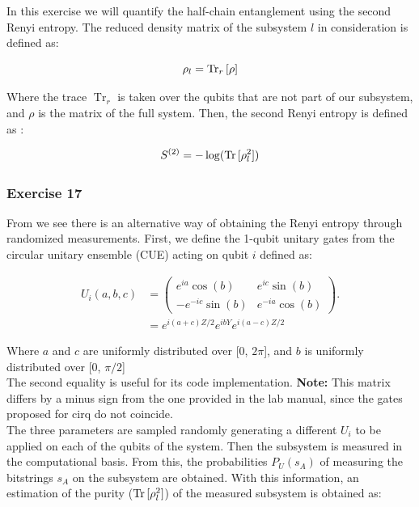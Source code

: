 In this exercise we will quantify the half-chain entanglement using the second Renyi entropy. The reduced density matrix of the subsystem $l$ in consideration is defined as:

\begin{equation}
    \rho_l = \operatorname{Tr}_r{[\rho]}
    \label{eq:reduced_matrix}
\end{equation}

Where the trace $\operatorname{Tr}_r$ is taken over the qubits that are not part of our subsystem, and $\rho$ is the matrix of the full system. Then, the second Renyi entropy is defined as \cite{manual}:

\begin{equation}
    S^{(2)} = - \log(\operatorname{Tr}{[\rho_l^2]})
    \label{eq:renyi_entropy}
\end{equation}


\subsubsection{Exercise 17}

From \cite{renyi_paper} we see there is an alternative way of obtaining the Renyi entropy through randomized measurements. First, we define the 1-qubit unitary gates from the circular unitary ensemble (CUE) acting on qubit $i$ defined as:

\begin{equation}
    \begin{split}
    U_i(a,b,c) & = \begin{pmatrix} e^{ia} \cos(b)  & e^{ic} \sin(b) \\ -e^{-ic} \sin(b) & e^{-ia} \cos(b) \end{pmatrix}. \\
     & = e^{i(a+c)Z/2} e^{ibY} e^{i(a-c)Z/2}
    \end{split}
\end{equation}

Where $a$ and $c$ are uniformly distributed over [$0$, $2\pi$], and $b$ is uniformly distributed over [0, $\pi/2$]\\

The second equality is useful for its code implementation. \textbf{Note: } This matrix differs by a minus sign from the one provided in the lab manual, since the gates proposed for cirq do not coincide.\\

The three parameters are sampled randomly generating a different $U_i$ to be applied on each of the qubits of the system. Then the subsystem is measured in the computational basis. From this, the probabilities $P_U(s_A)$ of measuring the bitstrings $s_A$ on the subsystem are obtained. With this information, an estimation of the purity ($\operatorname{Tr}{[\rho_l^2]}$) of the measured subsystem is obtained as:

